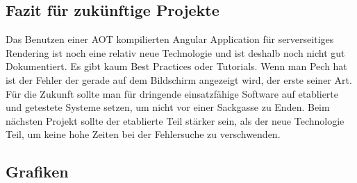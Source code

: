 \documentclass[11pt,a4paper]{article}
\begin{document}
\subsection{Fazit für zukünftige Projekte}
Das Benutzen einer AOT kompilierten Angular Application für serverseitiges Rendering ist noch eine relativ neue Technologie und ist deshalb noch nicht gut Dokumentiert. Es gibt kaum Best Practices oder Tutorials. Wenn man Pech hat ist der Fehler der gerade auf dem Bildschirm angezeigt wird, der erste seiner Art.\\ Für die Zukunft sollte man für dringende einsatzfähige Software auf etablierte und getestete Systeme setzen, um nicht vor einer Sackgasse zu Enden. Beim nächsten Projekt sollte der etablierte Teil stärker sein, als der neue Technologie Teil, um keine hohe Zeiten bei der Fehlersuche zu verschwenden.
\begin{appendices}

\begin{landscape}

\end{landscape}

\subsection{Grafiken}

\end{appendices}
\end{document}
